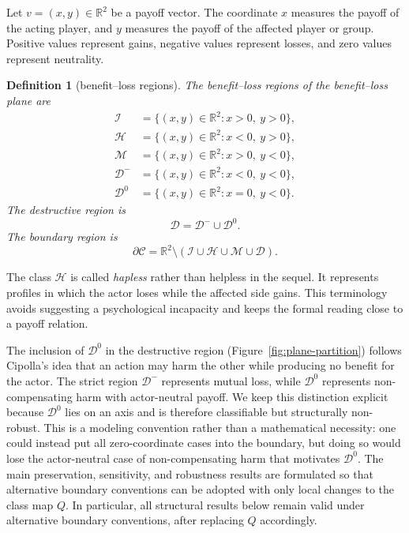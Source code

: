 \documentclass[a4paper,fleqn]{cas-dc}
\newtheorem{definition}{Definition}[section]
\theoremstyle{remark}
\newcommand{\R}{\mathbb{R}}
\begin{document}
Let $v=(x,y)\in\R^2$ be a payoff vector. The coordinate $x$ measures the payoff of the acting player, and $y$ measures the payoff of the affected player or group. Positive values represent gains, negative values represent losses, and zero values represent neutrality.

\begin{definition}[benefit--loss regions]
The benefit--loss regions of the benefit--loss plane are
\begin{align*}
\mathcal I &= \{(x,y)\in\R^2 : x>0,\ y>0\},\\
\mathcal H &= \{(x,y)\in\R^2 : x<0,\ y>0\},\\
\mathcal M &= \{(x,y)\in\R^2 : x>0,\ y<0\},\\
\mathcal D^- &= \{(x,y)\in\R^2 : x<0,\ y<0\},\\
\mathcal D^0 &= \{(x,y)\in\R^2 : x=0,\ y<0\}.
\end{align*}
The destructive region is
\[
\mathcal D = \mathcal D^-\cup \mathcal D^0.
\]
The boundary region is
\[
\partial\mathcal C = \R^2\setminus (\mathcal I\cup\mathcal H\cup\mathcal M\cup\mathcal D).
\]
\end{definition}

The class $\mathcal H$ is called \emph{hapless} rather than helpless in the sequel. It represents profiles in which the actor loses while the affected side gains. This terminology avoids suggesting a psychological incapacity and keeps the formal reading close to a payoff relation.

The inclusion of $\mathcal D^0$ in the destructive region (Figure~\ref{fig:plane-partition}) follows Cipolla's idea that an action may harm the other while producing no benefit for the actor. The strict region $\mathcal D^-$ represents mutual loss, while $\mathcal D^0$ represents non-compensating harm with actor-neutral payoff. We keep this distinction explicit because $\mathcal D^0$ lies on an axis and is therefore classifiable but structurally non-robust. This is a modeling convention rather than a mathematical necessity: one could instead put all zero-coordinate cases into the boundary, but doing so would lose the actor-neutral case of non-compensating harm that motivates $\mathcal D^0$. The main preservation, sensitivity, and robustness results are formulated so that alternative boundary conventions can be adopted with only local changes to the class map $Q$. In particular, all structural results below remain valid under alternative boundary conventions, after replacing $Q$ accordingly.
\end{document}
